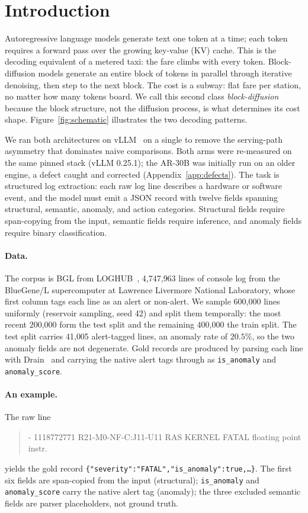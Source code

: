 \section{Introduction}
\label{sec:intro}

Autoregressive language models generate text one token at a time;
each token requires a forward pass over the growing key-value (KV)
cache. This is the decoding equivalent of a metered taxi: the fare
climbs with every token. Block-diffusion models generate an entire
block of tokens in
parallel through iterative denoising, then step to the next block.
The cost is a subway: flat fare per station, no matter how many
tokens board. We call this second class \emph{block-diffusion} because
the block structure, not the diffusion process, is what
determines its cost shape. Figure~\ref{fig:schematic} illustrates
the two decoding patterns.

We ran both architectures on vLLM~\cite{vllm2023} on a single
\gpuModel{} to remove the serving-path asymmetry that dominates naive
comparisons. Both arms were re-measured on the same pinned stack
(vLLM 0.25.1); the AR-30B was initially run on an older engine, a
defect caught and corrected (Appendix~\ref{app:defects}). The task is structured log
extraction: each raw log line describes a hardware or software event,
and the model must emit a JSON record with twelve fields spanning
structural, semantic, anomaly, and action categories. Structural
fields require span-copying from the input, semantic fields require
inference, and anomaly fields require binary classification.

\paragraph{Data.}

The corpus is BGL from LOGHUB~\cite{loghub}, 4{,}747{,}963 lines of
console log from the BlueGene/L supercomputer at Lawrence Livermore
National Laboratory, whose first column tags each line as an alert or
non-alert. We sample 600{,}000 lines uniformly (reservoir sampling,
seed 42) and split them temporally: the most recent 200{,}000 form the
test split and the remaining 400{,}000 the train split. The test split
carries 41{,}005 alert-tagged lines, an anomaly rate of $20.5\%$, so
the two anomaly fields are not degenerate. Gold records are produced
by parsing each line with Drain~\cite{drain} and carrying the native
alert tags through as \texttt{is\_anomaly} and \texttt{anomaly\_score}.

\paragraph{An example.}
The raw line
\begin{quote}\small\ttfamily
- 1118772771 R21-M0-NF-C:J11-U11 RAS KERNEL FATAL floating point instr.
\end{quote}
yields the gold record \texttt{\{"severity":"FATAL","is\_anomaly":true,\ldots\}}.
The first six fields are span-copied from the input (structural);
\texttt{is\_anomaly} and \texttt{anomaly\_score} carry the native alert
tag (anomaly); the three excluded semantic fields are parser
placeholders, not ground truth.

